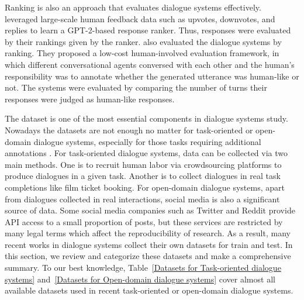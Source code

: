 Ranking is also an approach that evaluates dialogue systems effectively.~ leveraged large-scale human feedback data such as upvotes, downvotes, and replies to learn a GPT-2-based response ranker. Thus, responses were evaluated by their rankings given by the ranker.  also evaluated the dialogue systems by ranking. They proposed a low-cost human-involved evaluation framework, in which different conversational agents conversed with each other and the human's responsibility was to annotate whether the generated utterance was human-like or not. The systems were evaluated by comparing the number of turns their responses were judged as human-like responses.

\label{Data sets}
The dataset is one of the most essential components in dialogue systems study. Nowadays the datasets are not enough no matter for task-oriented or open-domain dialogue systems, especially for those tasks requiring additional annotations . For task-oriented dialogue systems, data can be collected via two main methods. One is to recruit human labor via crowdsourcing platforms to produce dialogues in a given task. Another is to collect dialogues in real task completions like film ticket booking. For open-domain dialogue systems, apart from dialogues collected in real interactions, social media is also a significant source of data. Some social media companies such as Twitter and Reddit provide API access to a small proportion of posts, but these services are restricted by many legal terms which affect the reproducibility of research. As a result, many recent works in dialogue systems collect their own datasets for train and test. 
In this section, we review and categorize these datasets and make a comprehensive summary. To our best knowledge, Table~\ref{Datasets for Task-oriented dialogue systems} and~\ref{Datasets for Open-domain dialogue systems} cover almost all available datasets used in recent task-oriented or open-domain dialogue systems.

